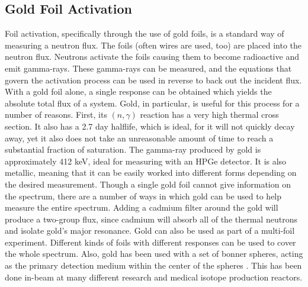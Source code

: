 \subsection{Gold Foil Activation}
Foil activation, specifically through the use of gold foils, is a standard way of measuring a neutron flux.
The foils (often wires are used, too) are placed into the neutron flux.
Neutrons activate the foils causing them to become radioactive and emit gamma-rays.
These gamma-rays can be measured, and the equations that govern the activation process can be used in reverse to back out the incident flux.
With a gold foil alone, a single response can be obtained which yields the absolute total flux of a system.
Gold, in particular, is useful for this process for a number of reasons.
First, its $(n, \gamma)$ reaction has a very high thermal cross section.
It also has a 2.7 day halflife, which is ideal, for it will not quickly decay away, yet it also does not take an unreasonable amount of time to reach a substantial fraction of saturation.
The gamma-ray produced by gold is approximately 412 keV, ideal for measuring with an HPGe detector.
It is also metallic, meaning that it can be easily worked into different forms depending on the desired measurement.
Though a single gold foil cannot give information on the spectrum, there are a number of ways in which gold can be used to help measure the entire spectrum.
Adding a cadmium filter around the gold will produce a two-group flux, since cadmium will absorb all of the thermal neutrons and isolate gold's major resonance.
Gold can also be used as part of a multi-foil experiment.
Different kinds of foils with different responses can be used to cover the whole spectrum.
Also, gold has been used with a set of bonner spheres, acting as the primary detection medium within the center of the spheres \cite{viererbl2012comparison} \cite{wang2008goldbonner}.
This has been done in-beam at many different research and medical isotope production reactors.

